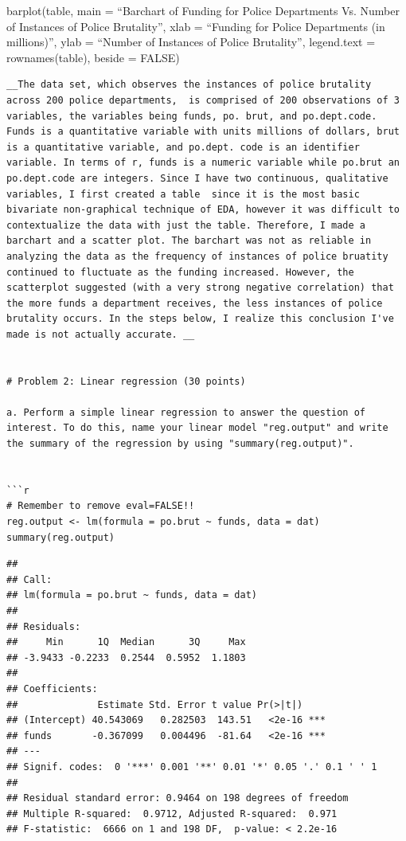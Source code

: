 \documentclass[
]{article}
\begin{document}
barplot(table, main = ``Barchart of Funding for Police Departments Vs.
Number of Instances of Police Brutality'', xlab = ``Funding for Police
Departments (in millions)'', ylab = ``Number of Instances of Police
Brutality'', legend.text = rownames(table), beside = FALSE)

\begin{verbatim}
__The data set, which observes the instances of police brutality across 200 police departments,  is comprised of 200 observations of 3 variables, the variables being funds, po. brut, and po.dept.code.  Funds is a quantitative variable with units millions of dollars, brut is a quantitative variable, and po.dept. code is an identifier variable. In terms of r, funds is a numeric variable while po.brut an po.dept.code are integers. Since I have two continuous, qualitative variables, I first created a table  since it is the most basic bivariate non-graphical technique of EDA, however it was difficult to contextualize the data with just the table. Therefore, I made a barchart and a scatter plot. The barchart was not as reliable in analyzing the data as the frequency of instances of police bruatity continued to fluctuate as the funding increased. However, the scatterplot suggested (with a very strong negative correlation) that the more funds a department receives, the less instances of police brutality occurs. In the steps below, I realize this conclusion I've made is not actually accurate. __


# Problem 2: Linear regression (30 points)

a. Perform a simple linear regression to answer the question of interest. To do this, name your linear model "reg.output" and write the summary of the regression by using "summary(reg.output)". 


```r
# Remember to remove eval=FALSE!!
reg.output <- lm(formula = po.brut ~ funds, data = dat)
summary(reg.output)
\end{verbatim}

\begin{verbatim}
## 
## Call:
## lm(formula = po.brut ~ funds, data = dat)
## 
## Residuals:
##     Min      1Q  Median      3Q     Max 
## -3.9433 -0.2233  0.2544  0.5952  1.1803 
## 
## Coefficients:
##              Estimate Std. Error t value Pr(>|t|)    
## (Intercept) 40.543069   0.282503  143.51   <2e-16 ***
## funds       -0.367099   0.004496  -81.64   <2e-16 ***
## ---
## Signif. codes:  0 '***' 0.001 '**' 0.01 '*' 0.05 '.' 0.1 ' ' 1
## 
## Residual standard error: 0.9464 on 198 degrees of freedom
## Multiple R-squared:  0.9712, Adjusted R-squared:  0.971 
## F-statistic:  6666 on 1 and 198 DF,  p-value: < 2.2e-16
\end{verbatim}
\end{document}
